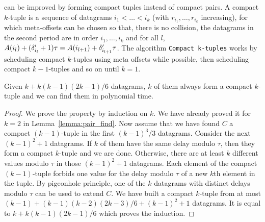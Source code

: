 \compactpair can be improved by forming compact tuples instead of compact pairs.
A compact $k$-tuple is a sequence of datagrams $i_1 < \dots < i_k$ (with $r_{i_1},\dots,r_{i_k}$ increasing), for which meta-offsets can be chosen so that, there is no collision, the datagrams in the second period are in order $i_1,\dots,i_k$ and for all $l$, $A(i_l) + (\delta'_{i_l} + 1)\tau = A(i_{l+1}) + \delta'_{i_{l+1}}\tau$.
The algorithm \texttt{Compact k-tuples} works by scheduling compact $k$-tuples
using meta offsets while possible, then scheduling compact $k-1$-tuples and so on until $k=1$.


\begin{lemma}\label{lemma:uple_find}
Given $k + k(k-1)(2k-1)/6$ datagrams, $k$ of them always form a compact $k$-tuple and we can find them in polynomial time. 
\end{lemma}
\begin{proof}
We prove the property by induction on $k$. We have already proved it for $k=2$ in Lemma~\ref{lemma:pair_find}.
Now assume that we have found $C$ a compact $(k-1)$-tuple in the first $(k-1)^3/3$
datagrams. Consider the next $(k-1)^2 + 1$ datagrams. If $k$ of them have the same delay modulo $\tau$,
then they form a compact $k$-tuple and we are done. Otherwise, there are at least $k$ different values modulo $\tau$
in those $(k-1)^2 + 1$ datagrams. Each element of the compact $(k-1)$-tuple forbids one value for the delay modulo $\tau$ of a new $k$th element in the tuple. By pigeonhole principle, one of the $k$ datagrams with distinct delays modulo $\tau$ can be used to extend $C$. We have built a compact $k$-tuple from at most $(k-1) + (k-1)(k-2)(2k-3)/6 + (k-1)^2 + 1$ datagrams.
It is equal to $k + k(k-1)(2k-1)/6$ which proves the induction.
\end{proof}


